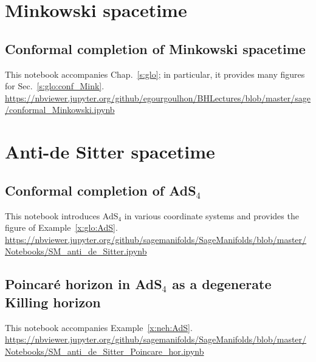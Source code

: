 \section{Minkowski spacetime}

\subsection{Conformal completion of Minkowski spacetime} \label{s:sam:conformal_Mink}

This notebook accompanies Chap.~\ref{s:glo}; in particular, it provides
many figures for Sec.~\ref{s:glo:conf_Mink}.\\[1ex]
{\footnotesize
\url{https://nbviewer.jupyter.org/github/egourgoulhon/BHLectures/blob/master/sage/conformal_Minkowski.ipynb}
}


\section{Anti-de Sitter spacetime}

\subsection{Conformal completion of \texorpdfstring{AdS$_4$}{AdS4}}  \label{s:sam:AdS}

This notebook introduces AdS$_4$ in various coordinate systems and provides
the figure of Example~\ref{x:glo:AdS}.\\[1ex]
{\footnotesize
\url{https://nbviewer.jupyter.org/github/sagemanifolds/SageManifolds/blob/master/Notebooks/SM_anti_de_Sitter.ipynb}
}


\subsection{Poincaré horizon in \texorpdfstring{AdS$_4$}{AdS4} as a degenerate Killing horizon} \label{s:sam:Poincare_hor}

This notebook accompanies Example~\ref{x:neh:AdS}.\\[1ex]
{\footnotesize
\url{https://nbviewer.jupyter.org/github/sagemanifolds/SageManifolds/blob/master/Notebooks/SM_anti_de_Sitter_Poincare_hor.ipynb}
}




